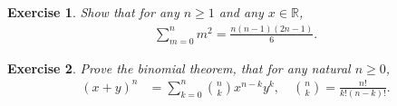 \documentclass{article}[12pt]
\newtheorem{exercise}{Exercise}[section]
\newcommand{\R}{\mathbb{R}}
\begin{document}
        \begin{exercise}
            Show that for any $n \ge 1$ and any $x \in \R$,
            \begin{align}
                \sum_{m=0}^n m^2 = \frac{n(n-1)(2n-1)}{6}.
            \end{align}
        \end{exercise}
        
        
        \begin{exercise}
            Prove the binomial theorem, that for any natural $n \ge 0$,
            \begin{align}
                (x + y)^n
                &= \sum_{k=0}^n {n \choose k} x^{n-k} y^k,\quad
                {n \choose k} = \frac{n!}{k! (n-k)!}.
            \end{align}
        \end{exercise}
        
        
        
\end{document}
